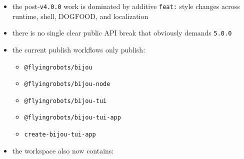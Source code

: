 \begin{itemize}
\tightlist
\item
  the post-\texttt{v\allowbreak{}4\allowbreak{}.\allowbreak{}0\allowbreak{}.\allowbreak{}0} work is dominated by additive \texttt{f\allowbreak{}e\allowbreak{}a\allowbreak{}t\allowbreak{}:} style changes across runtime, shell, DOGFOOD, and localization
\item
  there is no single clear public API break that obviously demands \texttt{5\allowbreak{}.\allowbreak{}0\allowbreak{}.\allowbreak{}0}
\item
  the current publish workflows only publish:

  \begin{itemize}
  \tightlist
  \item
    \texttt{@\allowbreak{}f\allowbreak{}l\allowbreak{}y\allowbreak{}i\allowbreak{}n\allowbreak{}g\allowbreak{}r\allowbreak{}o\allowbreak{}b\allowbreak{}o\allowbreak{}t\allowbreak{}s\allowbreak{}/\allowbreak{}b\allowbreak{}i\allowbreak{}j\allowbreak{}o\allowbreak{}u}
  \item
    \texttt{@\allowbreak{}f\allowbreak{}l\allowbreak{}y\allowbreak{}i\allowbreak{}n\allowbreak{}g\allowbreak{}r\allowbreak{}o\allowbreak{}b\allowbreak{}o\allowbreak{}t\allowbreak{}s\allowbreak{}/\allowbreak{}b\allowbreak{}i\allowbreak{}j\allowbreak{}o\allowbreak{}u\allowbreak{}-\allowbreak{}n\allowbreak{}o\allowbreak{}d\allowbreak{}e}
  \item
    \texttt{@\allowbreak{}f\allowbreak{}l\allowbreak{}y\allowbreak{}i\allowbreak{}n\allowbreak{}g\allowbreak{}r\allowbreak{}o\allowbreak{}b\allowbreak{}o\allowbreak{}t\allowbreak{}s\allowbreak{}/\allowbreak{}b\allowbreak{}i\allowbreak{}j\allowbreak{}o\allowbreak{}u\allowbreak{}-\allowbreak{}t\allowbreak{}u\allowbreak{}i}
  \item
    \texttt{@\allowbreak{}f\allowbreak{}l\allowbreak{}y\allowbreak{}i\allowbreak{}n\allowbreak{}g\allowbreak{}r\allowbreak{}o\allowbreak{}b\allowbreak{}o\allowbreak{}t\allowbreak{}s\allowbreak{}/\allowbreak{}b\allowbreak{}i\allowbreak{}j\allowbreak{}o\allowbreak{}u\allowbreak{}-\allowbreak{}t\allowbreak{}u\allowbreak{}i\allowbreak{}-\allowbreak{}a\allowbreak{}p\allowbreak{}p}
  \item
    \texttt{c\allowbreak{}r\allowbreak{}e\allowbreak{}a\allowbreak{}t\allowbreak{}e\allowbreak{}-\allowbreak{}b\allowbreak{}i\allowbreak{}j\allowbreak{}o\allowbreak{}u\allowbreak{}-\allowbreak{}t\allowbreak{}u\allowbreak{}i\allowbreak{}-\allowbreak{}a\allowbreak{}p\allowbreak{}p}
  \end{itemize}
\item
  the workspace also now contains:


\end{itemize}
